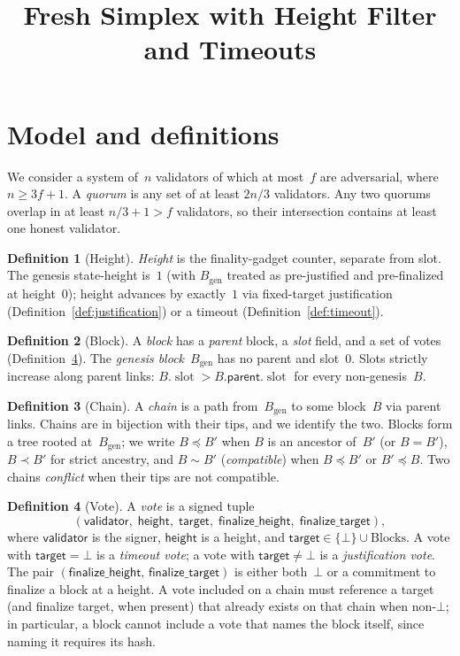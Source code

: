 \documentclass{article}
\title{Fresh Simplex with Height Filter and Timeouts}
\newcommand{\genesis}{\ensuremath{B_{\mathrm{gen}}}}
\newcommand{\slot}[0]{\ensuremath{\operatorname{\mathrm{slot}}}}
\newcommand{\target}{\mathsf{target}}
\newcommand{\height}{\mathsf{height}}
\newcommand{\validator}{\mathsf{validator}}
\newcommand{\parent}{\mathsf{parent}}
\newcommand{\finalizeHeight}{\mathsf{finalize\_height}}
\newcommand{\finalizeTarget}{\mathsf{finalize\_target}}
\theoremstyle{plain}
\theoremstyle{definition}
\newtheorem{definition}{Definition}
\theoremstyle{remark}
\begin{document}
\maketitle
\section{Model and definitions}\label{sec:model}

We consider a system of~$n$ validators of which at most~$f$ are adversarial, where $n \geq 3f + 1$.
A \emph{quorum} is any set of at least $2n/3$ validators.
Any two quorums overlap in at least $n/3 + 1 > f$ validators, so their intersection contains at least one honest validator.

\begin{definition}[Height]\label{def:height}
\emph{Height} is the finality-gadget counter, separate from slot.
The genesis state-height is~$1$ (with $\genesis$ treated as pre-justified and pre-finalized at height~$0$); height advances by exactly~$1$ via fixed-target justification (Definition~\ref{def:justification}) or a timeout (Definition~\ref{def:timeout}).
\end{definition}

\begin{definition}[Block]\label{def:block}
A \emph{block} has a \emph{parent} block, a \emph{slot} field, and a set of votes (Definition~\ref{def:vote}).
The \emph{genesis block}~$\genesis$ has no parent and slot~$0$.
Slots strictly increase along parent links: $B.\slot > B.\parent.\slot$ for every non-genesis~$B$.
\end{definition}

\begin{definition}[Chain]\label{def:chain}
A \emph{chain} is a path from~$\genesis$ to some block~$B$ via parent links.
Chains are in bijection with their tips, and we identify the two.
Blocks form a tree rooted at~$\genesis$; we write $B \preceq B'$ when $B$ is an ancestor of~$B'$ (or $B = B'$), $B \prec B'$ for strict ancestry, and $B \sim B'$ (\emph{compatible}) when $B \preceq B'$ or $B' \preceq B$.
Two chains \emph{conflict} when their tips are not compatible.
\end{definition}

\begin{definition}[Vote]\label{def:vote}
A \emph{vote} is a signed tuple
\[
  (\validator,\; \height,\; \target,\; \finalizeHeight,\; \finalizeTarget),
\]
where $\validator$ is the signer, $\height$ is a height, and $\target \in \{\bot\} \cup \mathrm{Blocks}$.
A vote with $\target = \bot$ is a \emph{timeout vote}; a vote with $\target \neq \bot$ is a \emph{justification vote}.
The pair $(\finalizeHeight,\, \finalizeTarget)$ is either both~$\bot$ or a commitment to finalize a block at a height.
A vote included on a chain must reference a target (and finalize target, when present) that already exists on that chain when non-$\bot$; in particular, a block cannot include a vote that names the block itself, since naming it requires its hash.
\end{definition}
\end{document}
